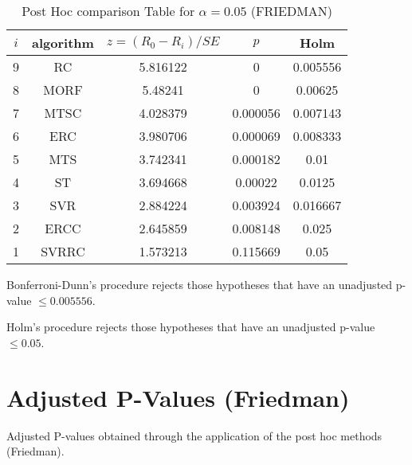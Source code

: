 \documentclass[a4paper,10pt]{article}
\begin{document}
\begin{landscape}
\begin{table}[!htp]
\centering\footnotesize
\begin{tabular}{ccccc}
$i$&algorithm&$z=(R_0 - R_i)/SE$&$p$&Holm \\
\hline9&RC&5.816122&0&0.005556\\8&MORF&5.48241&0&0.00625\\7&MTSC&4.028379&0.000056&0.007143\\6&ERC&3.980706&0.000069&0.008333\\5&MTS&3.742341&0.000182&0.01\\4&ST&3.694668&0.00022&0.0125\\3&SVR&2.884224&0.003924&0.016667\\2&ERCC&2.645859&0.008148&0.025\\1&SVRRC&1.573213&0.115669&0.05\\\hline
\end{tabular}
\caption{Post Hoc comparison Table for $\alpha=0.05$ (FRIEDMAN)}
\end{table}Bonferroni-Dunn's procedure rejects those hypotheses that have an unadjusted p-value $\le0.005556$.

Holm's procedure rejects those hypotheses that have an unadjusted p-value $\le0.05$.


\newpage

\section{Adjusted P-Values (Friedman)}


Adjusted P-values obtained through the application of the post hoc methods (Friedman).


\end{landscape}
\end{document}
